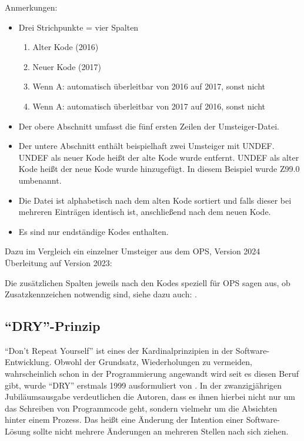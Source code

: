 Anmerkungen: 
\begin{itemize}
\item Drei Strichpunkte = vier Spalten
\begin{enumerate}
\item Alter Kode (2016)
\item Neuer Kode (2017)
\item Wenn A: automatisch überleitbar von 2016 auf 2017, sonst nicht
\item Wenn A: automatisch überleitbar von 2017 auf 2016, sonst nicht
\end{enumerate}
\item Der obere Abschnitt umfasst die fünf ersten Zeilen der Umsteiger-Datei. 
\item Der untere Abschnitt enthält beispielhaft zwei Umsteiger mit UNDEF. UNDEF als neuer Kode heißt der alte Kode wurde entfernt. UNDEF als alter Kode heißt der neue Kode wurde hinzugefügt. In diesem Beispiel wurde Z99.0 umbenannt. 
\item Die Datei ist alphabetisch nach dem alten Kode sortiert und falls dieser bei mehreren Einträgen identisch ist, anschließend nach dem neuen Kode.
\item Es sind nur endständige Kodes enthalten. 
\end{itemize}

Dazu im Vergleich ein einzelner Umsteiger aus dem OPS, Version 2024 Überleitung auf Version 2023:


Die zusätzlichen Spalten jeweils nach den Kodes speziell für OPS sagen aus, ob Zusatzkennzeichen notwendig sind, siehe dazu auch: \citep[Kategorie und Kode im OPS]{bfarmopskk}.

\subsection{"`DRY"'-Prinzip}

"`Don't Repeat Yourself"' ist eines der Kardinalprinzipien in der Software-Entwicklung. Obwohl der Grundsatz, Wiederholungen zu vermeiden, wahrscheinlich schon in der Programmierung angewandt wird seit es diesen Beruf gibt, wurde "`DRY"' erstmals 1999 ausformuliert von \citep[Seite 79ff]{thomas2019pragmatic}. In der zwanzigjährigen Jubiläumsausgabe verdeutlichen die Autoren, dass es ihnen hierbei nicht nur um das Schreiben von Programmcode geht, sondern vielmehr um die Absichten hinter einem Prozess. Das heißt eine Änderung der Intention einer Software-Lösung sollte nicht mehrere Änderungen an mehreren Stellen nach sich ziehen. 

